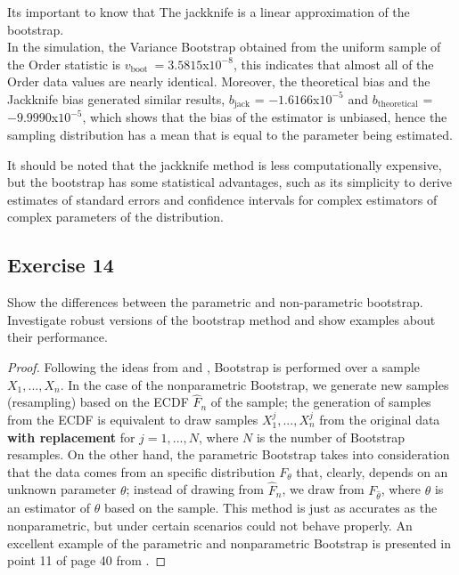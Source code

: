 \documentclass[11pt]{article}
\theoremstyle{definition}
\theoremstyle{remark}
\theoremstyle{remark}
\begin{document}
Its important to know that The jackknife is a linear approximation of
the bootstrap.
\\

In the simulation, the Variance Bootstrap obtained from the uniform
sample of the Order statistic is
$v_{\text {boot }} = 3.5815$x$10^{-8}$, this indicates that almost all
of the Order data values are nearly identical. Moreover, the
theoretical bias and the Jackknife bias generated similar results,
$b_{\mathrm{jack}}$ = $-1.6166$x$10^{-5}$ and
$b_{\mathrm{theoretical}}$ = $-9.9990$x$10^{-5}$, which shows that the
bias of the estimator is unbiased, hence the sampling distribution has
a mean that is equal to the parameter being estimated.


It should be noted that the jackknife method is less computationally
expensive, but the bootstrap has some statistical advantages, such as
its simplicity to derive estimates of standard errors and confidence
intervals for complex estimators of complex parameters of the
distribution.


\subsection*{Exercise 14}
Show the differences between the parametric and non-parametric
bootstrap. Investigate robust versions of the bootstrap method and
show examples about their performance.

\begin{proof}
  Following the ideas from \cite{wasserman2006} and
  \cite{kulperger2018}, Bootstrap is performed over a sample
  $X_1,...,X_n$. In the case of the nonparametric Bootstrap, we
  generate new samples (resampling) based on the ECDF $\hat{F}_n$ of
  the sample; the generation of samples from the ECDF is equivalent to
  draw samples $X_1^j,...,X_n^j$ from the original data \textbf{with
    replacement} for $j=1,...,N$, where $N$ is the number of Bootstrap
  resamples. On the other hand, the parametric Bootstrap takes into
  consideration that the data comes from an specific distribution
  $F_\theta$ that, clearly, depends on an unknown parameter $\theta$;
  instead of drawing from $\hat{F}_n$, we draw from
  $F_{\hat{\theta}}$, where $\hat{\theta}$ is an estimator of $\theta$
  based on the sample. This method is just as accurates as the
  nonparametric, but under certain scenarios could not behave
  properly. An excellent example of the parametric and nonparametric
  Bootstrap is presented in point 11 of page 40 from
  \cite{wasserman2006}.

\end{proof}
\end{document}
